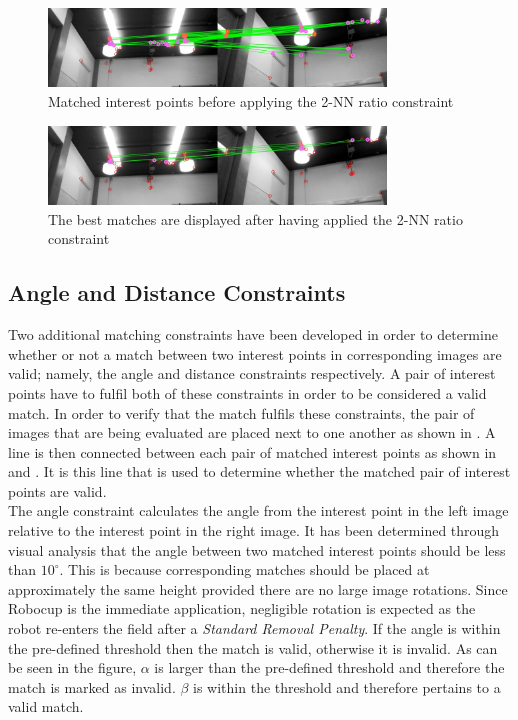 \documentclass[11pt]{report}
\begin{document}
\begin{figure}[h!] 
  \centering
    \includegraphics[width=0.8\textwidth]{../Drawings/Matching/feature_matching/dataset_2nn_matching_constraint_before.jpg}
    \caption{Matched interest points before applying the 2-NN ratio constraint}
    \label{fig:2nn_1}
\end{figure}

\begin{figure}[h!] 
  \centering
    \includegraphics[width=0.8\textwidth]{../Drawings/Matching/feature_matching/dataset_2nn_matching_constraint_after.jpg}
    \caption{The best matches are displayed after having applied the 2-NN ratio constraint}
    \label{fig:2nn_2}
\end{figure}


\subsection{Angle and Distance Constraints}
\label{sec:angleDistanceConstraints}
Two additional matching constraints have been developed in order to determine whether or not a match between two interest points in corresponding images are valid; namely, the angle and distance constraints respectively. A pair of interest points have to fulfil both of these constraints in order to be considered a valid match. In order to verify that the match fulfils these constraints, the pair of images that are being evaluated are placed next to one another as shown in . A line is then connected between each pair of matched interest points as shown in  and . It is this line that is used to determine whether the matched pair of interest points are valid.\\

The angle constraint calculates the angle from the interest point in the left image relative to the interest point in the right image. It has been determined through visual analysis that the angle between two matched interest points should be less than  $10^{\circ}$. This is because corresponding matches should be placed at approximately the same height provided there are no large image rotations. Since Robocup is the immediate application, negligible rotation is expected as the robot re-enters the field after a \textit{Standard Removal Penalty}.
If the angle is within the pre-defined threshold then the match is valid, otherwise it is invalid. As can be seen in the figure, $\alpha$ is larger than the pre-defined threshold and therefore the match is marked as invalid. $\beta$ is within the threshold and therefore pertains to a valid match. \\
\end{document}
